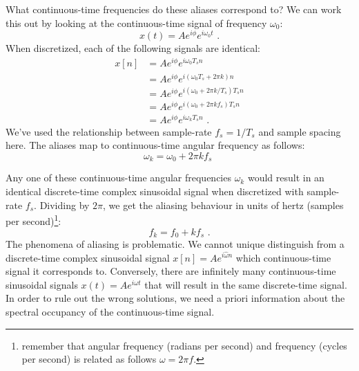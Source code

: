 What continuous-time frequencies do these aliases correspond to? We
can work this out by looking at the continuous-time signal of
frequency $\omega_0$:
\begin{equation}
  x(t) = A e^{i\phi} e^{i\omega_0 t}\,\,.
\end{equation}
When discretized, each of the following signals are identical:
\begin{align}
  x[n] &=A e^{i\phi} e^{i \omega_0 T_s n }\\
 &= A e^{i\phi} e^{i(\omega_0 T_s + 2\pi k) n }\\
  &= A e^{i\phi} e^{i(\omega_0 + 2\pi k/T_s) T_s n }  \\
    &= A e^{i\phi} e^{i(\omega_0 + 2\pi k f_s) T_s n }  \\
    &= A e^{i\phi} e^{i \omega_k T_s n } \,\,.
\end{align}
We've used the relationship between sample-rate $f_s=1/T_s$ and sample
spacing here. The aliases map to continuous-time angular frequency as
follows:
\begin{equation}
  \boxed{
    \omega_k = \omega_0 + 2\pi k f_s
    }\,\,
\end{equation}

Any one of these continuous-time angular frequencies $\omega_k$ would
result in an identical discrete-time complex sinusoidal signal when
discretized with sample-rate $f_s$. Dividing by
$2\pi$, we get the aliasing behaviour in units of hertz (samples per
second)\footnote{remember that angular frequency (radians per second)
  and frequency (cycles per second) is related as follows $\omega = 2\pi
  f$.}:
\begin{equation}
  \boxed{
    f_k = f_0 + k f_s
    }\,\,.
\end{equation}
The phenomena of aliasing is problematic. We cannot unique distinguish
from a discrete-time complex sinusoidal signal $x[n]=Ae^{i\hat{\omega}
  n}$ which continuous-time signal it corresponds to. Conversely,
there are infinitely many continuous-time sinusoidal signals
$x(t)=Ae^{i\omega t}$ that will result in the same discrete-time
signal. In order to rule out the wrong solutions, we need a priori
information about the spectral occupancy of the continuous-time
signal.

